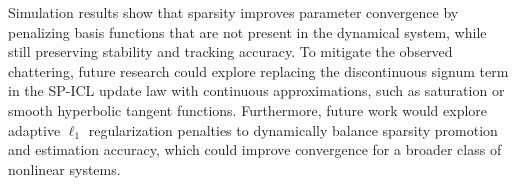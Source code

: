 \documentclass[conference]{ieeeconf}
\begin{document}
Simulation results show that sparsity improves parameter convergence by penalizing basis functions that are not present in the dynamical system, while still preserving stability and tracking accuracy. To mitigate the observed chattering, future research could explore replacing the discontinuous signum term in the SP-ICL update law with continuous approximations, such as saturation or smooth hyperbolic tangent functions. Furthermore, future work would explore adaptive $\ell_{1}$ regularization penalties to dynamically balance sparsity promotion and estimation accuracy, which could improve convergence for a broader class of nonlinear systems.

\small


\end{document}
